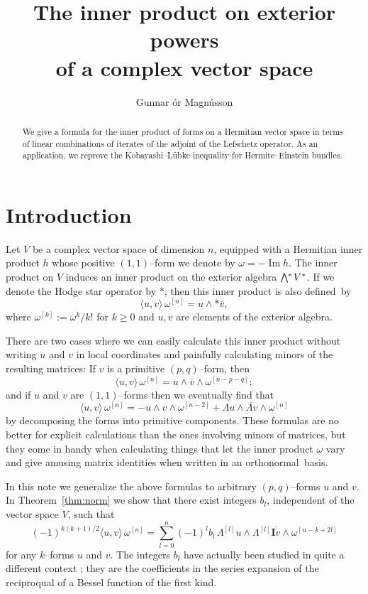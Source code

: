 \documentclass[11pt,a4paper]{amsart}
\title[The inner product of complex forms]
{The inner product on exterior powers\\ of a complex vector space}
\author{Gunnar \TH\'{o}r Magn\'{u}sson}
\def\^#1{^{[#1]}}
\def\bw#1{\bigwedge{}^{\mkern-5mu #1}\mkern2mu}
\def\I{\mathbf{I}}
\theoremstyle{slthm}
\theoremstyle{sldef}
\theoremstyle{slrem}
\numberwithin{equation}{section}
\begin{document}
\begin{abstract}
We give a formula for the inner product of forms on a Hermitian vector
space in terms of linear combinations of iterates of the adjoint of the
Lefschetz operator.  As an application, we reprove the
Kobayashi--L\"{u}bke inequality for Hermite--Einstein bundles. 
\end{abstract}


\maketitle 



\section*{Introduction}


Let $V$ be a complex vector space of dimension $n$, equipped with a
Hermitian inner product $h$ whose positive $(1,1)$--form we denote by
$\omega = -\operatorname{Im} h$. The inner product on $V$ induces an inner
product on the exterior algebra $\bw{*} V^*$. If we denote the Hodge star
operator by $*$, then this inner product is also defined~by%
$$
\langle u, v\rangle \, \omega\^n 
= u \wedge *\overline v,
$$ 
where $\omega\^k := \omega^k / k!$ for $k \geq 0$ and $u,v$ are elements
of the exterior algebra.

There are two cases where we can easily calculate this inner product
without writing $u$ and $v$ in local coordinates and painfully calculating
minors of the resulting matrices: If $v$ is a primitive
$(p,q)$--form, then
$$
\langle u, v\rangle \, \omega\^n 
= u \wedge \overline v \wedge \omega\^{n-p-q};
$$ 
and if $u$ and $v$ are $(1,1)$--forms then we eventually find that
$$
\langle u, v\rangle \, \omega\^n 
= - u \wedge v \wedge \omega\^{n-2}
+\Lambda u \wedge \overline{\Lambda v} \wedge \omega\^{n}
$$
by decomposing the forms into primitive components. These formulas are 
no better for explicit calculations than the ones involving minors of
matrices, but they come in handy when calculating things that let the
inner product $\omega$ vary and give amusing matrix identities when
written in an orthonormal~basis.%

In this note we generalize the above formulas to arbitrary $(p,q)$--forms
$u$ and $v$. In Theorem~\ref{thm:norm} we show that there exist integers
$b_l$, independent of the vector space $V$, such that
$$
    (-1)^{k(k+1)/2}
    \langle u, v \rangle \, \omega\^n
    = \sum_{l=0}^n (-1)^{l} b_l \, 
    \Lambda\^l u \wedge \Lambda\^l \overline{\I v}
    \wedge \omega\^{n-k+2l}
$$
for any $k$--forms $u$ and $v$. The integers $b_l$ have actually been
studied in quite a different context \cite{Carlitz,Riordan,OEIS}; they are
the coefficients in the series expansion of the reciproqual of a Bessel
function of the first kind. 
\end{document}
